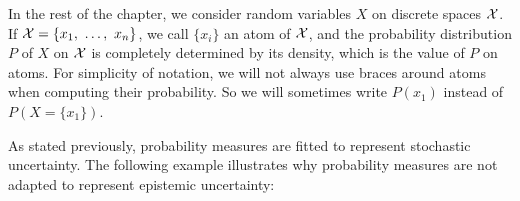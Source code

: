 In the rest of the chapter, we consider random variables $X$ on discrete spaces $\mathcal{X}$. If $\mathcal{X}=\{x_1,~\dots,~x_n\}$, we call $\{x_i\}$ an atom of $\mathcal{X}$, and the probability distribution $P$ of $X$ on $\mathcal{X}$ is completely determined by its density, which is the value of $P$ on atoms. For simplicity of notation, we will not always use braces around atoms when computing their probability. So we will sometimes write $P(x_1)$ instead of $P(X=\{x_1\})$.

As stated previously, probability measures are fitted to represent stochastic uncertainty. The following example illustrates why probability measures are not adapted to represent epistemic uncertainty:
